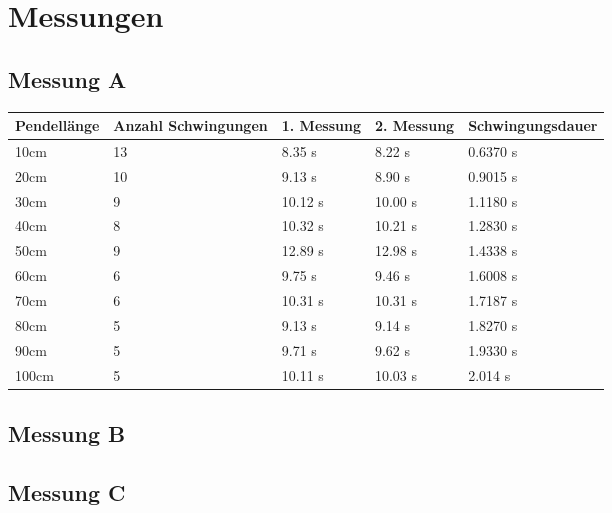 \documentclass{report}
\begin{document}
    \chapter*{Messungen}
    \section*{Messung A}
    \begin{center}
        \begin{tabular}{ | m{5em} | m{4cm}| m{2cm} | m{2cm} | m{3cm} | }
            \hline
            Pendellänge & Anzahl Schwingungen &1. Messung & 2. Messung & Schwingungsdauer\\ 
            \hline
            10cm & 13 & 8.35 s & 8.22 s & 0.6370 s\\ 
            \hline
            20cm & 10 & 9.13 s & 8.90 s & 0.9015 s \\ 
            \hline
            30cm & 9 & 10.12 s & 10.00 s & 1.1180 s \\ 
            \hline
            40cm & 8 & 10.32 s & 10.21 s & 1.2830 s \\ 
            \hline
            50cm & 9 & 12.89 s & 12.98 s & 1.4338 s \\ 
            \hline
            60cm & 6 & 9.75 s & 9.46 s & 1.6008 s \\ 
            \hline
            70cm & 6 & 10.31 s & 10.31 s & 1.7187 s \\ 
            \hline
            80cm & 5 & 9.13 s & 9.14 s & 1.8270 s \\ 
            \hline
            90cm & 5 & 9.71 s & 9.62 s & 1.9330 s \\ 
            \hline
            100cm & 5 & 10.11 s & 10.03 s & 2.014 s \\ 
            \hline

          \end{tabular}
    \end{center}
    \section*{Messung B}
    \section*{Messung C}
\end{document}
